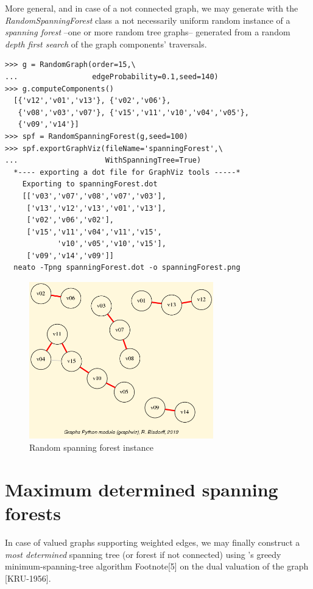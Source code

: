 More general, and in case of a not connected graph, we may generate with the \emph{RandomSpanningForest} class a not necessarily uniform random instance of a \emph{spanning forest} --one or more random tree graphs-- generated from a random \emph{depth first search} of the graph components' traversals.
\begin{lstlisting}
>>> g = RandomGraph(order=15,\
...                 edgeProbability=0.1,seed=140)
>>> g.computeComponents()
  [{'v12','v01','v13'}, {'v02','v06'},
   {'v08','v03','v07'}, {'v15','v11','v10','v04','v05'},
   {'v09','v14'}]
>>> spf = RandomSpanningForest(g,seed=100)
>>> spf.exportGraphViz(fileName='spanningForest',\
...                    WithSpanningTree=True)
  *---- exporting a dot file for GraphViz tools -----*
    Exporting to spanningForest.dot
    [['v03','v07','v08','v07','v03'],
     ['v13','v12','v13','v01','v13'],
     ['v02','v06','v02'],
     ['v15','v11','v04','v11','v15',
            'v10','v05','v10','v15'],
     ['v09','v14','v09']]
  neato -Tpng spanningForest.dot -o spanningForest.png
\end{lstlisting}
\begin{figure}[h]
\sidecaption
\includegraphics[width=8cm]{Figures/spanningForest.png}
\caption{Random spanning forest instance} 
\label{fig:23.6}       %
\end{figure}

\section{Maximum determined spanning forests}
\label{sec:23.3}

In case of valued graphs supporting weighted edges, we may finally construct a \emph{most determined} spanning tree (or forest if not connected) using \Kruskal's greedy minimum-spanning-tree algorithm Footnote[5] on the dual valuation of the graph [KRU-1956].

